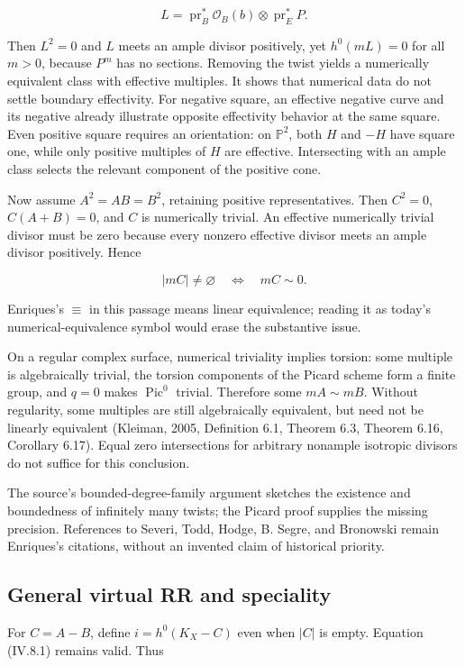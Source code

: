 \[
L=\operatorname{pr}_B^*\mathcal O_B(b)\otimes\operatorname{pr}_E^*P.
\]

Then \(L^2=0\) and \(L\) meets an ample divisor positively, yet \(h^0(mL)=0\) for all \(m>0\), because \(P^m\) has no sections. Removing the twist yields a numerically equivalent class with effective multiples. It shows that numerical data do not settle boundary effectivity. For negative square, an effective negative curve and its negative already illustrate opposite effectivity behavior at the same square. Even positive square requires an orientation: on \(\mathbb P^2\), both \(H\) and \(-H\) have square one, while only positive multiples of \(H\) are effective. Intersecting with an ample class selects the relevant component of the positive cone.

Now assume \(A^2=AB=B^2\), retaining positive representatives. Then \(C^2=0\), \(C(A+B)=0\), and \(C\) is numerically trivial. An effective numerically trivial divisor must be zero because every nonzero effective divisor meets an ample divisor positively. Hence

\[
|mC|\ne\varnothing\quad\Longleftrightarrow\quad mC\sim0.
\]

Enriques's \(\equiv\) in this passage means linear equivalence; reading it as today's numerical-equivalence symbol would erase the substantive issue.

On a regular complex surface, numerical triviality implies torsion: some multiple is algebraically trivial, the torsion components of the Picard scheme form a finite group, and \(q=0\) makes \(\operatorname{Pic}^0\) trivial. Therefore some \(mA\sim mB\). Without regularity, some multiples are still algebraically equivalent, but need not be linearly equivalent (Kleiman, 2005, Definition 6.1, Theorem 6.3, Theorem 6.16, Corollary 6.17). Equal zero intersections for arbitrary nonample isotropic divisors do not suffice for this conclusion.

The source's bounded-degree-family argument sketches the existence and boundedness of infinitely many twists; the Picard proof supplies the missing precision. References to Severi, Todd, Hodge, B. Segre, and Bronowski remain Enriques's citations, without an invented claim of historical priority.

\subsection{General virtual RR and speciality}

For \(C=A-B\), define \(i=h^0(K_X-C)\) even when \(|C|\) is empty. Equation (IV.8.1) remains valid. Thus

